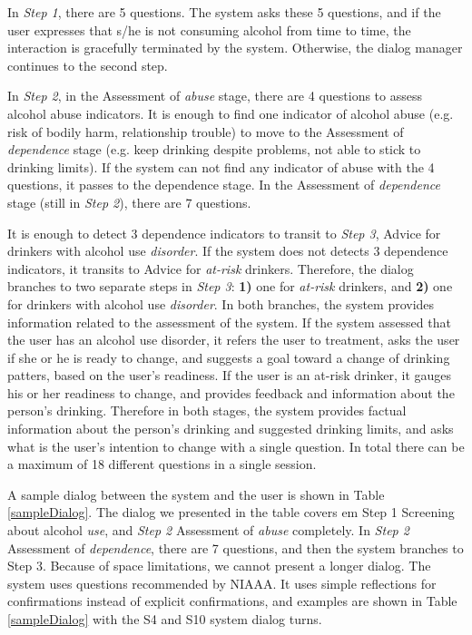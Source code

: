 \begin{sloppy}
In {\em Step 1}, there are 5 questions.  The system asks these 5 questions, and if the user expresses that s/he is not consuming alcohol from time to time, the interaction is gracefully terminated by the system. Otherwise, the dialog manager continues to the second step.  

In {\em Step 2}, in the Assessment of {\em abuse} stage, there are 4 questions to assess alcohol abuse indicators.  It is enough to find one indicator of alcohol abuse (e.g. risk of bodily harm, relationship trouble) to move to the Assessment of {\em dependence} stage (e.g. keep drinking despite problems, not able to stick to drinking limits). If the system can not find any indicator of abuse with the 4 questions, it passes to the dependence stage. In the Assessment of {\em dependence} stage (still in {\em Step 2}), there are 7 questions. 

It is enough to detect 3 dependence indicators to transit to {\em Step 3}, Advice for drinkers with alcohol use {\em disorder}.  If the system does not detects 3 dependence indicators, it transits to Advice for {\em at-risk} drinkers. Therefore, the dialog branches to two separate steps in {\em Step 3}: \textbf{1)} one for {\em at-risk} drinkers, and \textbf{2)} one for drinkers with alcohol use {\em disorder}. In both branches, the system provides information related to the assessment of the system.  If the system assessed that the user has an alcohol use disorder, it refers the user to treatment, asks the user if she or he is ready to change, and suggests a goal toward a change of drinking patters, based on the user's readiness. If the user is an at-risk drinker, it gauges his or her readiness to change, and provides feedback and information about the person's drinking. Therefore in both stages, the system provides factual information about the person's drinking and suggested drinking limits, and asks what is the user's intention to change with a single question.  In total there can be a maximum of 18 different questions in a single session.   

A sample dialog between the system and the user is shown in Table \ref{sampleDialog}. The dialog we presented in the table covers {em Step 1}  Screening about alcohol {\em use},  and {\em Step 2} Assessment of {\em abuse} completely. In {\em Step 2} Assessment of {\em dependence}, there are 7 questions, and then the system branches to Step 3. Because of space limitations, we cannot present a longer dialog.  The system uses questions recommended by NIAAA. It uses simple reflections for confirmations instead of explicit confirmations, and examples are shown in Table \ref{sampleDialog} with the S4 and S10 system dialog turns.



\end{sloppy}
